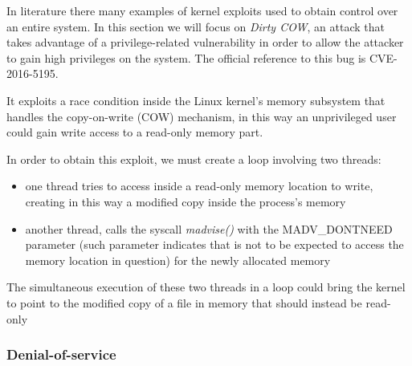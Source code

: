 \documentclass[a4paper,12pt]{article}
\begin{document}
In literature there many examples of kernel exploits used to obtain control over
an entire system. In this section we will focus on \textit{Dirty COW}, an attack
that takes advantage of a privilege-related vulnerability in order to allow the
attacker to gain high privileges on the system. The official reference to this
bug is CVE-2016-5195.\par It exploits a race condition inside the Linux kernel's
memory subsystem that handles the copy-on-write (COW) mechanism, in this way an
unprivileged user could gain write access to a read-only memory
part\cite{red_hat_dirtycow}.\par In order to obtain this exploit, we must create
a loop involving two threads:
\begin{itemize}
  \item one thread tries to access inside a read-only memory location to
  write, creating in this way a modified copy inside the process's memory
  \item another thread, calls the syscall
  \textit{madvise()}\cite{madvise_description} with the MADV\_DONTNEED parameter
  (such parameter indicates that is not to be expected to access the memory
  location in question) for the newly allocated memory
  \end{itemize}
The simultaneous execution of these two threads in a loop could bring the
kernel to point to the modified copy of a file in memory that should instead be
read-only\cite{dirtycow_how_it_worrks}

\subsubsection{Denial-of-service}
\end{document}
